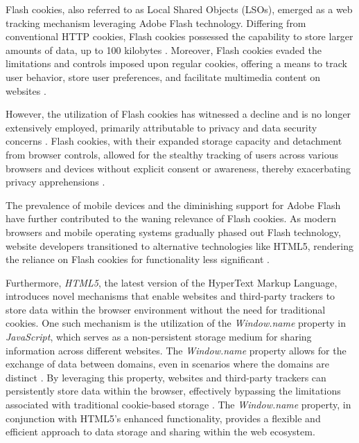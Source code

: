 Flash cookies, also referred to as Local Shared Objects (LSOs), emerged as a web tracking mechanism leveraging Adobe Flash technology.
Differing from conventional HTTP cookies, Flash cookies possessed the capability to store larger amounts of data, up to 100 kilobytes \cite{sipior2011online}.
Moreover, Flash cookies evaded the limitations and controls imposed upon regular cookies, offering a means to track user behavior,
store user preferences, and facilitate multimedia content on websites \cite{krishnamurthy2011privacy}.

However, the utilization of Flash cookies has witnessed a decline and is no longer extensively employed, primarily attributable
to privacy and data security concerns \cite{hoofnagle2010different}. Flash cookies, with their expanded storage capacity and detachment from browser controls,
allowed for the stealthy tracking of users across various browsers and devices without explicit consent or awareness,
thereby exacerbating privacy apprehensions \cite{soltani2010flash}.

The prevalence of mobile devices and the diminishing support for Adobe Flash have further contributed to the waning relevance of Flash
cookies. As modern browsers and mobile operating systems gradually phased out Flash technology, website developers transitioned to
alternative technologies like HTML5, rendering the reliance on Flash cookies for functionality less significant \cite{bbcflash}.

Furthermore, \emph{HTML5}, the latest version of the HyperText Markup Language, introduces novel mechanisms that enable websites and
third-party trackers to store data within the browser environment without the need for traditional cookies. One such mechanism
is the utilization of the \emph{Window.name} property in \emph{JavaScript}, which serves as a non-persistent storage medium for sharing
information across different websites. The \emph{Window.name} property allows for the exchange of data between domains,
even in scenarios where the domains are distinct \cite{sy2018tracking}. By leveraging this property, websites and third-party trackers
can persistently store data within the browser, effectively bypassing the limitations associated with traditional
cookie-based storage \cite{pan2015not}. The \emph{Window.name} property, in conjunction with HTML5's enhanced functionality, provides a
flexible and efficient approach to data storage and sharing within the web ecosystem.

